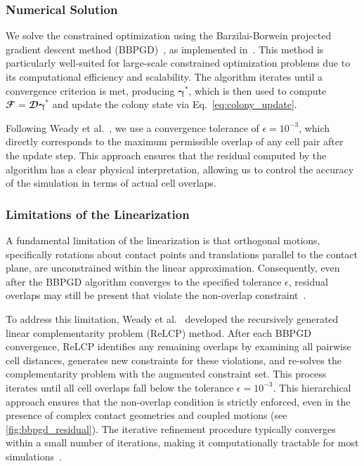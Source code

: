 \documentclass[conference]{IEEEtran}
\begin{document}
\subsubsection{Numerical Solution}

We solve the constrained optimization using the Barzilai-Borwein projected gradient descent method (BBPGD)~\cite{BBPGD}, as implemented in~\cite{Weady2024SM,Yan2019}. This method is particularly well-suited for large-scale constrained optimization problems due to its computational efficiency and scalability. The algorithm iterates until a convergence criterion is met, producing $\boldsymbol{\gamma}^*$, which is then used to compute $\mathbfcal{F} = \mathbfcal{D}\boldsymbol{\gamma}^*$ and update the colony state via Eq.~\ref{eq:colony_update}.

Following Weady et al.~\cite{Weady2024SM}, we use a convergence tolerance of $\epsilon = 10^{-3}$, which directly corresponds to the maximum permissible overlap of any cell pair after the update step. This approach ensures that the residual computed by the algorithm has a clear physical interpretation, allowing us to control the accuracy of the simulation in terms of actual cell overlaps.

\subsubsection{Limitations of the Linearization}

A fundamental limitation of the linearization is that orthogonal motions, specifically rotations about contact points and translations parallel to the contact plane, are unconstrained within the linear approximation. Consequently, even after the BBPGD algorithm converges to the specified tolerance $\epsilon$, residual overlaps may still be present that violate the non-overlap constraint~\cite{Weady2024SM}.

To address this limitation, Weady et al.~\cite{Weady2024SM} developed the recursively generated linear complementarity problem (ReLCP) method. After each BBPGD convergence, ReLCP identifies any remaining overlaps by examining all pairwise cell distances, generates new constraints for these violations, and re-solves the complementarity problem with the augmented constraint set. This process iterates until all cell overlaps fall below the tolerance $\epsilon = 10^{-3}$. This hierarchical approach ensures that the non-overlap condition is strictly enforced, even in the presence of complex contact geometries and coupled motions (see \autoref{fig:bbpgd_residual}). The iterative refinement procedure typically converges within a small number of iterations, making it computationally tractable for most simulations~\cite{Weady2024SM}.
\end{document}
